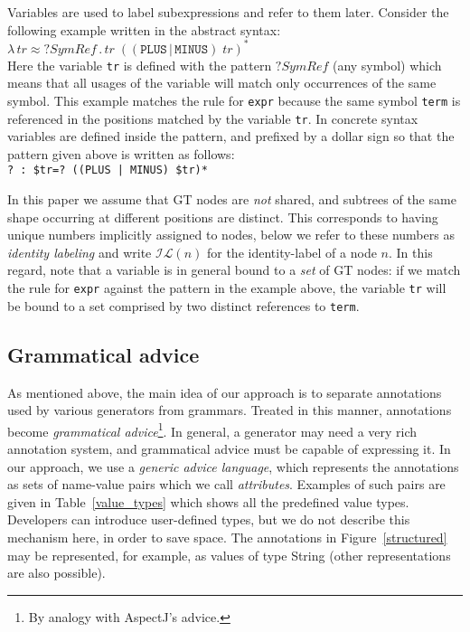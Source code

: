 \documentclass{IOS-Book-Article}     %
\newcommand{\abstr}[3]{\lambda \, #1 \approx #2 \,.\, #3}
\newcommand{\tabref}[1]{Table~\ref{#1}}
\newcommand{\figref}[1]{Figure~\ref{#1}}
\begin{document}
Variables are used to label subexpressions and refer to them later. Consider the following example written in the abstract syntax:\\
\indent
$
\abstr{tr}{?SymRef}{tr\;((\mathtt{PLUS} \,|\, \mathtt{MINUS})\; tr)^*}
$\\
Here the variable \texttt{tr} is defined with the pattern $?SymRef$ (any symbol) which means that all usages of the variable will match only occurrences of the same symbol. This example matches the rule for \texttt{expr} because the same symbol \texttt{term} is referenced in the positions matched by the variable \texttt{tr}. In concrete syntax variables are defined inside the pattern, and prefixed by a dollar sign so that the pattern given above is written as follows:\\
\indent\lstinline!? : $tr=? ((PLUS | MINUS) $tr)*!

In this paper we assume that GT nodes are \emph{not} shared, and subtrees of the same shape occurring at different positions are distinct. This corresponds to having unique numbers implicitly assigned to nodes, below we refer to these numbers as \emph{identity labeling} and write $\mathcal{IL}(n)$ for the identity-label of a node $n$. In this regard, note that a variable is in general bound to a \emph{set} of GT nodes: if we match the rule for \texttt{expr} against the pattern in the example above, the variable \texttt{tr} will be bound to a set comprised by two distinct references to \texttt{term}.

\subsection{Grammatical advice}
As mentioned above, the main idea of our approach is to separate annotations used by various generators from grammars. Treated in this manner, annotations become \emph{grammatical advice}\footnote{By analogy with AspectJ's advice.}. In general, a generator may need a very rich annotation system, and grammatical advice must be capable of expressing it. In our approach, we use a \emph{generic advice language}, which represents the annotations as sets of name-value pairs which we call \emph{attributes}. Examples of such pairs are given in \tabref{value_types} which shows all the predefined value types. Developers can introduce user-defined types, but we do not describe this mechanism here, in order to save space. The annotations in \figref{structured} may be represented, for example, as values of type String (other representations are also possible).
\end{document}
